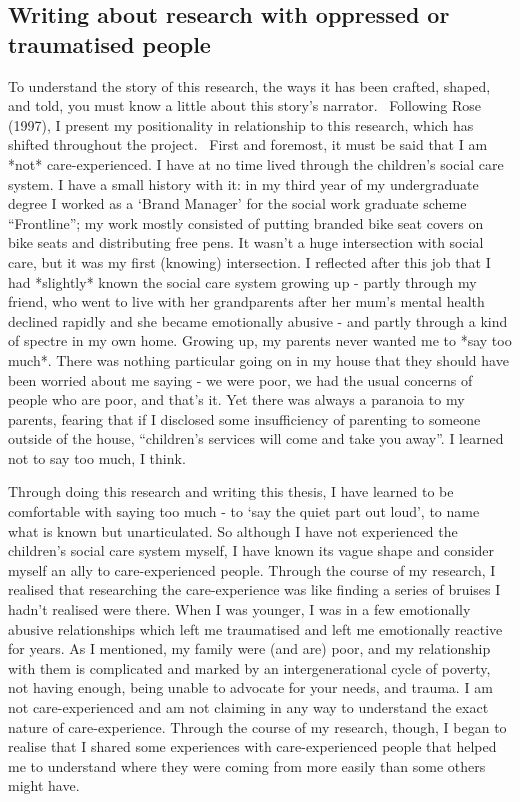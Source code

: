 \subsection{Writing about research with oppressed or traumatised people}
To understand the story of this research, the ways it has been crafted, shaped, and told, you must know a little about this story’s narrator. ~Following Rose (1997), I present my positionality in relationship to this research, which has shifted throughout the project.~ First and foremost, it must be said that I am *not* care-experienced. I have at no time lived through the children’s social care system. I have a small history with it: in my third year of my undergraduate degree I worked as a ‘Brand Manager’ for the social work graduate scheme “Frontline”; my work mostly consisted of putting branded bike seat covers on bike seats and distributing free pens. It wasn’t a huge intersection with social care, but it was my first (knowing) intersection. I reflected after this job that I had *slightly* known the social care system growing up - partly through my friend, who went to live with her grandparents after her mum’s mental health declined rapidly and she became emotionally abusive - and partly through a kind of spectre in my own home. Growing up, my parents never wanted me to *say too much*. There was nothing particular going on in my house that they should have been worried about me saying - we were poor,  we had the usual concerns of people who are poor, and that’s it. Yet there was always a paranoia to my parents, fearing that if I disclosed some insufficiency of parenting to someone outside of the house, “children’s services will come and take you away”. I learned not to say too much, I think.

Through doing this research and writing this thesis, I have learned to be comfortable with saying too much - to ‘say the quiet part out loud’, to name what is known but unarticulated. So although I have not experienced the children’s social care system myself, I have known its vague shape and consider myself an ally to care-experienced people. Through the course of my research, I realised that researching the care-experience was like finding a series of bruises I hadn’t realised were there. When I was younger, I was in a few emotionally abusive relationships which left me traumatised and left me emotionally reactive for years. As I mentioned, my family were (and are) poor, and my relationship with them is complicated and marked by an intergenerational cycle of poverty, not having enough, being unable to advocate for your needs, and trauma. I am not care-experienced and am not claiming in any way to understand the exact nature of care-experience. Through the course of my research, though, I began to realise that I shared some experiences with care-experienced people that helped me to understand where they were coming from more easily than some others might have. 

